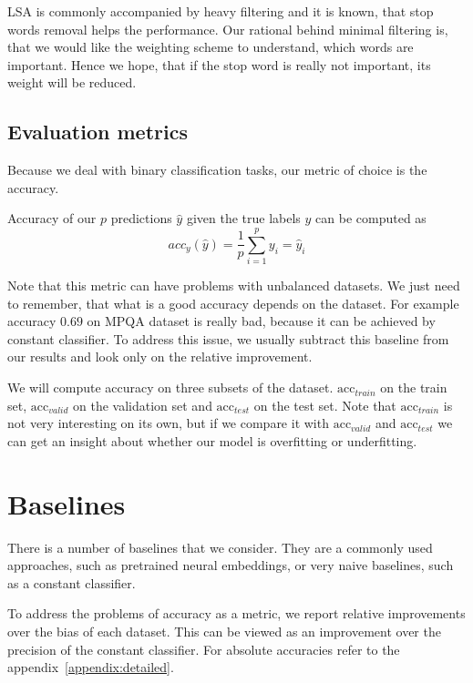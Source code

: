     LSA is commonly accompanied by heavy filtering and it is known, that stop words removal helps the performance.
    Our rational behind minimal filtering is, that we would like the weighting scheme to understand, which words are important.
    Hence we hope, that if the stop word is really not important, its weight will be reduced.
    
    \subsection{Evaluation metrics}
    
    Because we deal with binary classification tasks, our metric of choice is the accuracy.
    
    Accuracy of our $p$ predictions $\hat{y}$ given the true labels $y$ can be computed as
    $$acc_y(\hat{y}) = \frac{1}{p}\sum_{i=1}^py_i =\hat{y}_i$$
    
    Note that this metric can have problems with unbalanced datasets. 
    We just need to remember, that what is a good accuracy depends on the dataset.
    For example accuracy $0.69$ on MPQA dataset is really bad, because it can be achieved by constant classifier.
    To address this issue, we usually subtract this baseline from our results and look only on the relative improvement. 
    
    We will compute accuracy on three subsets of the dataset. 
    $\mathrm{acc}_{train}$ on the train set, $\mathrm{acc}_{valid}$ on the validation set and $\mathrm{acc}_{test}$ on the test set.
    Note that $\mathrm{acc}_{train}$ is not very interesting on its own, but if we compare it with $\mathrm{acc}_{valid}$ and $\mathrm{acc}_{test}$ we can get an insight about whether our model is overfitting or underfitting.


\section{Baselines} \label{sec:baseline}

    There is a number of baselines that we consider.
    They are a commonly used approaches, such as pretrained neural embeddings, or very naive baselines, such as a constant classifier.
    
    To  address the problems of accuracy as a metric, we report relative improvements over the bias of each dataset.
    This can be viewed as an improvement over the precision of the constant classifier.
    For absolute accuracies refer to the appendix~\ref{appendix:detailed}. 

